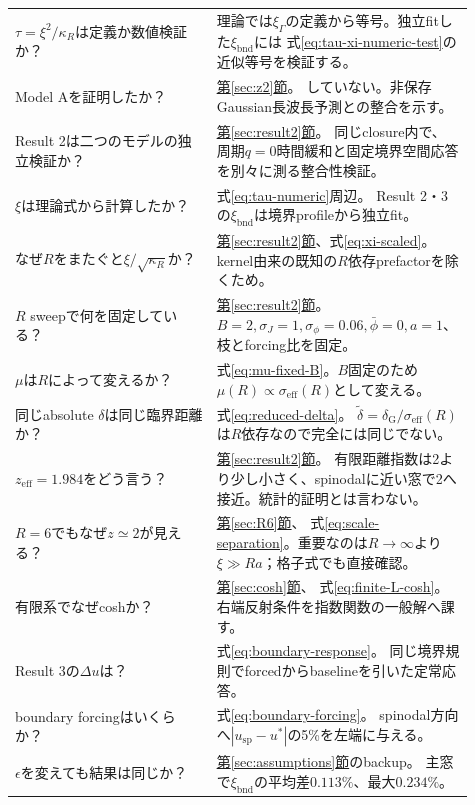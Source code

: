 \documentclass[a4paper,12pt]{ltjsarticle}
\newcommand{\Gauss}{\mathrm G}
\newcommand{\bnd}{\mathrm{bnd}}
\begin{document}
\begin{longtable}{p{0.41\linewidth}p{0.50\linewidth}}
$\tau=\xi^2/\kappa_R$は定義か数値検証か？ &
理論では$\xi_{\Gamma}$の定義から等号。独立fitした$\xi_{\bnd}$には
式\eqref{eq:tau-xi-numeric-test}の近似等号を検証する。 \\
Model Aを証明したか？ & \hyperref[sec:z2]{第\ref*{sec:z2}節}。
していない。非保存Gaussian長波長予測との整合を示す。 \\
Result 2は二つのモデルの独立検証か？ & \hyperref[sec:result2]{第\ref*{sec:result2}節}。
同じclosure内で、周期$q=0$時間緩和と固定境界空間応答を別々に測る整合性検証。 \\
$\xi$は理論式から計算したか？ & 式\eqref{eq:tau-numeric}周辺。
Result 2・3の$\xi_{\bnd}$は境界profileから独立fit。 \\
なぜ$R$をまたぐと$\xi/\sqrt{\kappa_R}$か？ &
\hyperref[sec:result2]{第\ref*{sec:result2}節}、式\eqref{eq:xi-scaled}。
kernel由来の既知の$R$依存prefactorを除くため。 \\
$R$ sweepで何を固定している？ & \hyperref[sec:result2]{第\ref*{sec:result2}節}。
$B=2,\sigma_J=1,\sigma_\phi=0.06,\bar\phi=0,a=1$、枝とforcing比を固定。 \\
$\mu$は$R$によって変えるか？ & 式\eqref{eq:mu-fixed-B}。$B$固定のため
$\mu(R)\propto\sigma_{\mathrm{eff}}(R)$として変える。 \\
同じabsolute $\delta$は同じ臨界距離か？ & 式\eqref{eq:reduced-delta}。
$\widetilde\delta=\delta_{\Gauss}/\sigma_{\mathrm{eff}}(R)$は$R$依存なので完全には同じでない。 \\
$z_{\mathrm{eff}}=1.984$をどう言う？ & \hyperref[sec:result2]{第\ref*{sec:result2}節}。
有限距離指数は2より少し小さく、spinodalに近い窓で2へ接近。統計的証明とは言わない。 \\
$R=6$でもなぜ$z\simeq2$が見える？ & \hyperref[sec:R6]{第\ref*{sec:R6}節}、
式\eqref{eq:scale-separation}。重要なのは$R\to\infty$より$\xi\gg Ra$；格子式でも直接確認。 \\
有限系でなぜcoshか？ & \hyperref[sec:cosh]{第\ref*{sec:cosh}節}、
式\eqref{eq:finite-L-cosh}。右端反射条件を指数関数の一般解へ課す。 \\
Result 3の$\Delta u$は？ & 式\eqref{eq:boundary-response}。
同じ境界規則でforcedからbaselineを引いた定常応答。 \\
boundary forcingはいくらか？ & 式\eqref{eq:boundary-forcing}。
spinodal方向へ$|u_{\mathrm{sp}}-u^*|$の5\%を左端に与える。 \\
$\epsilon$を変えても結果は同じか？ & \hyperref[sec:assumptions]{第\ref*{sec:assumptions}節}のbackup。
主窓で$\xi_{\bnd}$の平均差$0.113\%$、最大$0.234\%$。 \\

\end{longtable}
\end{document}

